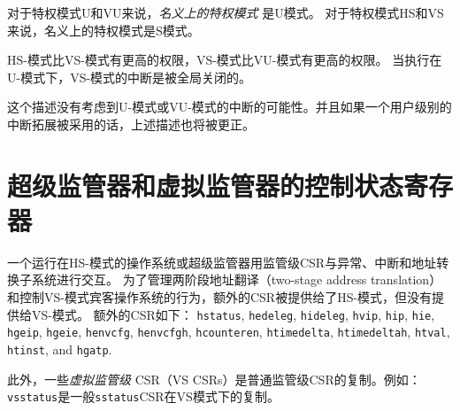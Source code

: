 对于特权模式U和VU来说，\textit{名义上的特权模式} 是U模式。
对于特权模式HS和VS来说，名义上的特权模式是S模式。

HS-模式比VS-模式有更高的权限，VS-模式比VU-模式有更高的权限。
当执行在U-模式下，VS-模式的中断是被全局关闭的。

\begin{commentary}

这个描述没有考虑到U-模式或VU-模式的中断的可能性。并且如果一个用户级别的中断拓展被采用的话，上述描述也将被更正。
\end{commentary}


\section{超级监管器和虚拟监管器的控制状态寄存器}

一个运行在HS-模式的操作系统或超级监管器用监管级CSR与异常、中断和地址转换子系统进行交互。
为了管理两阶段地址翻译（two-stage address translation）和控制VS-模式宾客操作系统的行为，额外的CSR被提供给了HS-模式，但没有提供给VS-模式。
额外的CSR如下：
{\tt hstatus}, {\tt hedeleg}, {\tt hideleg}, {\tt hvip}, {\tt hip}, {\tt hie},
{\tt hgeip}, {\tt hgeie}, {\tt henvcfg}, {\tt henvcfgh},
{\tt hcounteren}, {\tt htimedelta}, {\tt htimedeltah}, {\tt htval},
{\tt htinst}, and {\tt hgatp}.

此外，一些{\em 虚拟监管级} CSR（VS CSRs）是普通监管级CSR的复制。例如：{\tt vsstatus}是一般{\tt sstatus}CSR在VS模式下的复制。

